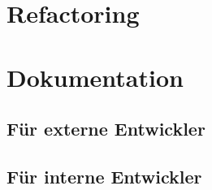 \section{Refactoring}

\section{Dokumentation}
\subsection{Für externe Entwickler}

\subsection{Für interne Entwickler}
